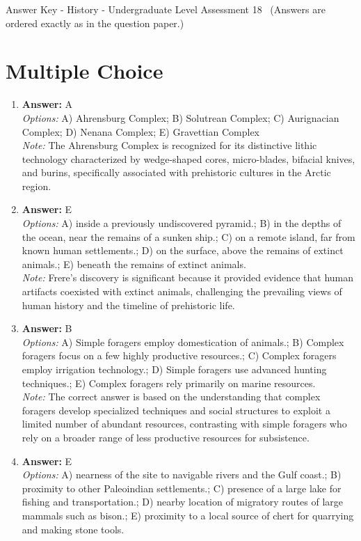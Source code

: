 \documentclass[12pt]{article}
\begin{document}
\begin{center}
Answer Key - History - Undergraduate Level Assessment 18 \
\small (Answers are ordered exactly as in the question paper.)
\end{center}

\section*{Multiple Choice}
\begin{enumerate}[label=\arabic*.]
\item \textbf{Answer:} A
\\ \textit{Options:} A) Ahrensburg Complex; B) Solutrean Complex; C) Aurignacian Complex; D) Nenana Complex; E) Gravettian Complex
\\ \textit{Note:} The Ahrensburg Complex is recognized for its distinctive lithic technology characterized by wedge-shaped cores, micro-blades, bifacial knives, and burins, specifically associated with prehistoric cultures in the Arctic region.
\item \textbf{Answer:} E
\\ \textit{Options:} A) inside a previously undiscovered pyramid.; B) in the depths of the ocean, near the remains of a sunken ship.; C) on a remote island, far from known human settlements.; D) on the surface, above the remains of extinct animals.; E) beneath the remains of extinct animals.
\\ \textit{Note:} Frere's discovery is significant because it provided evidence that human artifacts coexisted with extinct animals, challenging the prevailing views of human history and the timeline of prehistoric life.
\item \textbf{Answer:} B
\\ \textit{Options:} A) Simple foragers employ domestication of animals.; B) Complex foragers focus on a few highly productive resources.; C) Complex foragers employ irrigation technology.; D) Simple foragers use advanced hunting techniques.; E) Complex foragers rely primarily on marine resources.
\\ \textit{Note:} The correct answer is based on the understanding that complex foragers develop specialized techniques and social structures to exploit a limited number of abundant resources, contrasting with simple foragers who rely on a broader range of less productive resources for subsistence.
\item \textbf{Answer:} E
\\ \textit{Options:} A) nearness of the site to navigable rivers and the Gulf coast.; B) proximity to other Paleoindian settlements.; C) presence of a large lake for fishing and transportation.; D) nearby location of migratory routes of large mammals such as bison.; E) proximity to a local source of chert for quarrying and making stone tools.

\end{enumerate}
\end{document}
